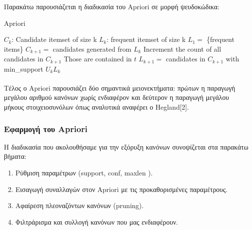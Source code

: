 \documentclass[12pt,a4paper,final]{article}
\begin{document}
Παρακάτω παρουσιάζεται η διαδικασία του \foreignlanguage{english}{Apriori} σε μορφή ψευδοκώδικα:\\
\begin{algorithm}
\caption{Apriori}
\begin{algorithmic}

\STATE $C_{k}$: Candidate itemset of size k 
\STATE $L_{k}$: frequent itemset of size k
\STATE $L_{1} = $ \{frequent items\}
\STATE $C_{k+1} =$ candidates generated from $L_{k}$
\STATE Increment the count of all candidates in $C_{k+1}$
\STATE Those are contained in $t$
\ENDFOR
\STATE  $L_{k+1} =$ candidates in $C_{k+1}$ with min\_support
\ENDFOR
\RETURN $U_{k} L_{k}$
\end{algorithmic}
\end{algorithm}
\paragraph{}
Τέλος ο \foreignlanguage{english}{Apriori} παρουσιάζει δύο σημαντικά μειονεκτήματα: πρώτων η παραγωγή μεγάλου αριθμού κανόνων χωρίς ενδιαφέρον και δεύτερον η παραγωγή μεγάλου μήκους στοιχειοσυνόλων όπως αναλυτικά αναφέρει ο \foreignlanguage{english}{Hegland}[2].\\



\subsubsection{Εφαρμογή του \foreignlanguage{english}{Apriori}}

 Η διαδικασία που ακολουθήσαμε  για την εξόρυξη κανόνων συνοψίζεται στα παρακάτω βήματα:\\
 \begin{enumerate}
 \item Ρύθμιση παραμέτρων (\foreignlanguage{english}{support}, \foreignlanguage{english}{conf}, \foreignlanguage{english}{maxlen} ).
 \item Εισαγωγή συναλλαγών στον \foreignlanguage{english}{Apriori} με τις προκαθορισμένες παραμέτρους.
 \item Αφαίρεση  πλεοναζόντων κανόνων (\foreignlanguage{english}{pruning}).
 \item Φιλτράρισμα και συλλογή κανόνων που μας ενδιαφέρουν.
 \end{enumerate}
   
\end{document}
